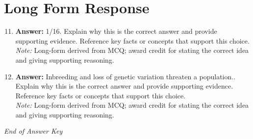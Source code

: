 \documentclass[12pt]{article}
\begin{document}
\section*{Long Form Response}
\begin{enumerate}[label=\arabic*.]
\setcounter{enumi}{10}
\item \textbf{Answer:} 1/16. Explain why this is the correct answer and provide supporting evidence. Reference key facts or concepts that support this choice.
\\ \textit{Note:} Long-form derived from MCQ; award credit for stating the correct idea and giving supporting reasoning.
\item \textbf{Answer:} Inbreeding and loss of genetic variation threaten a population.. Explain why this is the correct answer and provide supporting evidence. Reference key facts or concepts that support this choice.
\\ \textit{Note:} Long-form derived from MCQ; award credit for stating the correct idea and giving supporting reasoning.
\end{enumerate}

\vfill
\noindent\textit{End of Answer Key}
\end{document}
